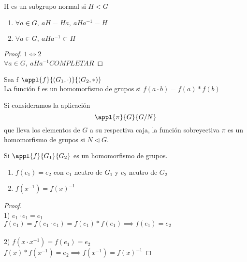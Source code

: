 \documentclass[a4paper,10pt]{apuntes}
\newenvironment{example}[1][Ejemplo]{\begin{trivlist}
\item[\hskip \labelsep {\bfseries #1}]}{\end{trivlist}}
\begin{document}
 
 \begin{theorem}
 H es un subgrupo normal si $H<G$\\
 \begin{enumerate}
 \item $\forall a \in G,\ aH = Ha,\ aHa^{-1}=H$
 \item $\forall a \in G,\ aHa^{-1} \subset H$
 \end{enumerate}
 \end{theorem}
 \begin{proof}
 $1 \iff 2$\\
 $\forall a\in G,\ aHa^{-1} COMPLETAR$
 \end{proof}
 
 \begin{defn}
 Sea f $\appl{f}{(G_1, \cdot )}{(G_2, \ast )}$\\
 La función f es un homomorfismo de grupos si 
 $f(a\cdot b) = f(a)\ast f(b)$
 \end{defn}
 
 \begin{example}
 Si consideramos la aplicación $$\appl{\pi}{G}{G/N}$$ que lleva
 los elementos de $G$ a su respectiva caja, la función sobreyectiva $\pi$ es 
 un homomorfismo de grupos si $N\lhd G$.
 \end{example}
 
 \begin{props} 
 Si $\appl{f}{G_1}{G_2}$ es un homomorfismo de grupos.
 \begin{enumerate}
 \item $f(e_1) = e_2$ con $e_1$ neutro de $G_1$ y $e_2$ neutro de $G_2$
 \item $f(x^{-1}) = f(x)^{-1}$
 \end{enumerate}
 \end{props}
 
 \begin{proof} \\
 1) $e_1\cdot e_1 = e_1$\\ 
 $f(e_1)=f(e_1\cdot e_1) = f(e_1)\ast f(e_1) \implies f(e_1) = e_2$\\
 \\
 2) $f(x\cdot x^{-1}) = f(e_1) = e_2$\\ 
 $f(x)\ast f(x^{-1}) = e_2 \implies f(x^{-1}) = f(x)^{-1}$
 
 \end{proof}
 
\end{document}
